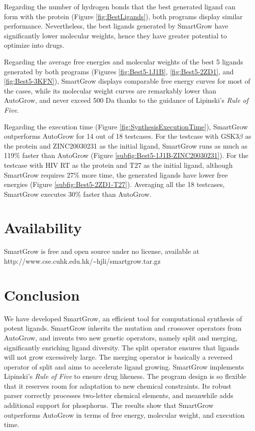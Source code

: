 Regarding the number of hydrogen bonds that the best generated ligand can form with the protein (Figure \ref {fig:BestLigands}), both programs display similar performance. Nevertheless, the best ligands generated by SmartGrow have significantly lower molecular weights, hence they have greater potential to optimize into drugs.

Regarding the average free energies and molecular weights of the best 5 ligands generated by both programs (Figures \ref{fig:Best5-1J1B}, \ref{fig:Best5-2ZD1}, and \ref{fig:Best5-3KFN}), SmartGrow displays comparable free energy curves for most of the cases, while its molecular weight curves are remarkably lower than AutoGrow, and never exceed 500 Da thanks to the guidance of Lipinski's \textit{Rule of Five}.

Regarding the execution time (Figure \ref{fig:SynthesisExecutionTime}), SmartGrow outperforms AutoGrow for 14 out of 18 testcases. For the testcase with GSK3$\beta$ as the protein and ZINC20030231 as the initial ligand, SmartGrow runs as much as 119\% faster than AutoGrow (Figure \ref{subfig:Best5-1J1B-ZINC20030231}). For the testcase with HIV RT as the protein and T27 as the initial ligand, although SmartGrow requires 27\% more time, the generated ligands have lower free energies (Figure \ref{subfig:Best5-2ZD1-T27}). Averaging all the 18 testcases, SmartGrow executes 30\% faster than AutoGrow.

\section{Availability}

SmartGrow is free and open source under no license, available at http://www.cse.cuhk.edu.hk/\textasciitilde hjli/smartgrow.tar.gz

\section{Conclusion}

We have developed SmartGrow, an efficient tool for computational synthesis of potent ligands. SmartGrow inherits the mutation and crossover operators from AutoGrow, and invents two new genetic operators, namely split and merging, significantly enriching ligand diversity. The split operator ensures that ligands will not grow excessively large. The merging operator is basically a reversed operator of split and aims to accelerate ligand growing. SmartGrow implements Lipinski's \textit{Rule of Five} \citep{168-2004} to ensure drug likeness. The program design is so flexible that it reserves room for adaptation to new chemical constraints. Its robust parser correctly processes two-letter chemical elements, and meanwhile adds additional support for phosphorus. The results show that SmartGrow outperforms AutoGrow in terms of free energy, molecular weight, and execution time.

